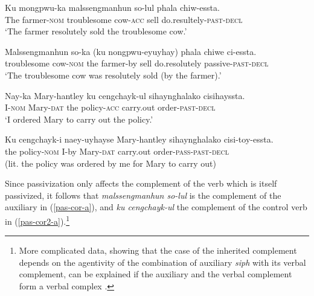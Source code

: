 \documentclass[output=paper]{langsci/langscibook}
\begin{document}
	
	\begin{exe}
		\ex  \label{pas-cor}
		
		\begin{xlist} 
			
			\ex  \label{pas-cor-a}
			\gll Ku mongpwu-ka malssengmanhun so-lul 	phala chiw-essta.\\
			The farmer-\textsc{nom} troublesome cow-\textsc{acc} sell do.resultely-\textsc{past-decl}\\
			\glt `The farmer resolutely sold the troublesome cow.'
			
			\ex  \label{pas-cor-b}
			\gll Malssengmanhun so-ka  (ku nongpwu-eyuyhay) phala chiwe ci-essta.\\
			troublesome cow-\textsc{nom} the farmer-by sell do.resolutely 	passive-\textsc{past-decl}\\	 
			\glt `The troublesome cow was resolutely sold (by the farmer).'
			
		\end{xlist}
	\end{exe}
	
	
	
	\begin{exe}
		\ex  \label{pas-cor2}
		
		\begin{xlist} 
			
			\ex \label{pas-cor2-a}
			\gll Nay-ka Mary-hantley  ku cengchayk-ul sihaynghalako cisihayssta.\\
			I-\textsc{nom}	Mary-\textsc{dat} the policy-\textsc{acc}  carry.out order-\textsc{past-decl}\\
			\glt `I ordered Mary to carry out the policy.'
			
			\ex \label{pas-cor2-b}
			\gll Ku cengchayk-i	naey-uyhayse	Mary-hantley	sihaynghalako	 cisi-toy-essta.\\
			the policy-\textsc{nom} I-by Mary-\textsc{dat} carry.out order-\textsc{pass-past-decl}\\
			\glt (lit. the policy was ordered by me for Mary to carry out)
			
		\end{xlist}
	\end{exe}
	
	
	Since passivization only affects the complement of the verb which is itself passivized, it follows that \textit{malssengmanhun so-lul} is the complement of the auxiliary in (\ref{pas-cor-a}), and \textit{ku cengchayk-ul} the complement of the control verb in (\ref{pas-cor2-a}).\footnote{More complicated data, showing that the case of the inherited complement depends on the agentivity of the combination of auxiliary \textit{siph} with its verbal complement, can be explained if the auxiliary and the verbal complement form a verbal complex \citep{Yoo2003}. }
	
\end{document}
